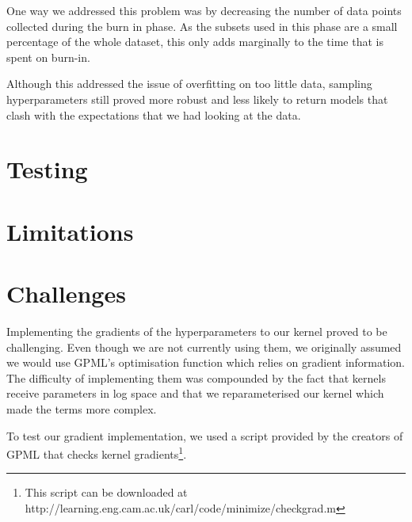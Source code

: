 \documentclass[a4paper,12pt,twoside,openright]{report}
\begin{document}
One way we addressed this problem was by decreasing the number of data points collected during the burn in phase. As the subsets used in this phase are a small percentage of the whole dataset, this only adds marginally to the time that is spent on burn-in.

Although this addressed the issue of overfitting on too little data, sampling hyperparameters still proved more robust and less likely to return models that clash with the expectations that we had looking at the data.






\section{Testing}
\section{Limitations}
\section{Challenges}


Implementing the gradients of the hyperparameters to our kernel proved to be challenging. Even though we are not currently using them, we originally assumed we would use GPML's optimisation function which relies on gradient information. The difficulty of implementing them was compounded by the fact that kernels receive parameters in log space and that we reparameterised our kernel which made the terms more complex.

To test our gradient implementation, we used a script provided by the creators of GPML that checks kernel gradients\footnote{This script can be downloaded at http://learning.eng.cam.ac.uk/carl/code/minimize/checkgrad.m}.



\end{document}

